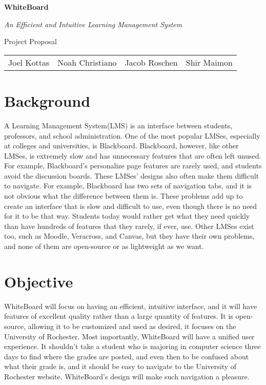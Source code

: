 \documentclass{article}
\begin{document}
\begin{center}
    \huge{\textbf{WhiteBoard}}
    
    \huge{\textit{An Efficient and Intuitive Learning Management System}}

    \huge{Project Proposal}

    \vspace{10 pt}

    \large{
        \begin{tabular}{cccc}
            Joel Kottas&Noah Christiano&Jacob Roschen&Shir Maimon\\
        \end{tabular}
    }

\end{center}

\vspace{10 pt}

\section{Background}

A Learning Management System(LMS) is an interface between students,
professors, and school administration. One of the most popular LMSes,
especially at colleges and universities, is Blackboard\cite{Blackboard}.
Blackboard, however, like other LMSes, is extremely slow and has unnecessary
features that are often left unused. For example, Blackboard’s personalize
page features are rarely used, and students avoid the discussion boards. These
LMSes’ designs also often make them difficult to navigate. For example,
Blackboard has two sets of navigation tabs, and it is not obvious what the
difference between them is. These problems add up to create an interface that
is slow and difficult to use, even though there is no need for it to be that
way. Students today would rather get what they need quickly than have hundreds
of features that they rarely, if ever, use. Other LMSes exist too, such as
Moodle\cite{Moodle}, Veracross\cite{Veracross}, and Canvas\cite{Canvas}, but
they have their own problems, and none of them are open-source or as
lightweight as we want.

\section{Objective}

WhiteBoard will focus on having an efficient, intuitive interface, and it will
have features of excellent quality rather than a large quantity of features. It
is open-source, allowing it to be customized and used as desired, it focuses on
the University of Rochester. Most importantly, WhiteBoard will have a unified
user experience. It shouldn’t take a student who is majoring in computer
science three days to find where the grades are posted, and even then to be
confused about what their grade is, and it should be easy to navigate to the
University of Rochester website. WhiteBoard’s design will make such navigation
a pleasure.
\end{document}
